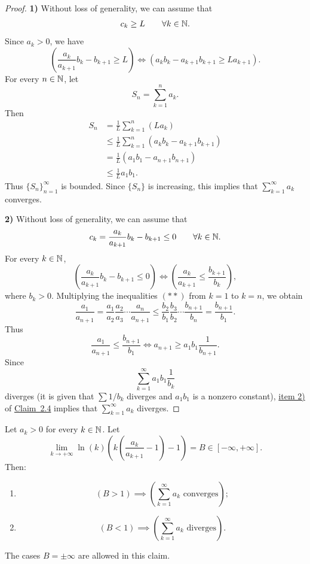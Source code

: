 \begin{proof}
\textbf{1)} Without loss of generality, we can assume that
\[
c_k\ge L\qquad\forall k\in\mathbb{N}.
\]
Since $a_k>0$, we have
\begin{equation}
\left(\frac{a_k}{a_{k+1}}b_k-b_{k+1}\ge L\right)
\iff
\left(a_kb_k-a_{k+1}b_{k+1}\ge La_{k+1}\right).
\tag{$*$}\label{eq:2:star:1}
\end{equation}
For every $n\in\mathbb{N}$, let
\[
S_n=\sum_{k=1}^{n}a_k.
\]
Then
\begin{align*}
S_n
&=\frac1L\sum_{k=1}^{n}(La_k)\\
&\le\frac1L\sum_{k=1}^{n}(a_kb_k-a_{k+1}b_{k+1})\\
&=\frac1L(a_1b_1-a_{n+1}b_{n+1})\\
&\le\frac1L a_1b_1.
\end{align*}
Thus $\{S_n\}_{n=1}^{\infty}$ is bounded. Since $\{S_n\}$ is increasing, this implies that $\sum_{k=1}^{\infty}a_k$ converges.

\medskip
\noindent\textbf{2)} Without loss of generality, we can assume that
\[
c_k=\frac{a_k}{a_{k+1}}b_k-b_{k+1}\le0
\qquad\forall k\in\mathbb{N}.
\]
For every $k\in\mathbb{N}$,
\begin{equation}
\left(\frac{a_k}{a_{k+1}}b_k-b_{k+1}\le0\right)
\iff
\left(\frac{a_k}{a_{k+1}}\le\frac{b_{k+1}}{b_k}\right),
\tag{$**$}\label{eq:2:starstar:1}
\end{equation}
where $b_k>0$. Multiplying the inequalities \hyperref[eq:2:starstar:1]{$(**)$} from $k=1$ to $k=n$, we obtain
\[
\frac{a_1}{a_{n+1}}
=\frac{a_1}{a_2}\frac{a_2}{a_3}\cdots\frac{a_n}{a_{n+1}}
\le
\frac{b_2}{b_1}\frac{b_3}{b_2}\cdots\frac{b_{n+1}}{b_n}
=\frac{b_{n+1}}{b_1}.
\]
Thus
\[
\frac{a_1}{a_{n+1}}\le\frac{b_{n+1}}{b_1}
\iff
a_{n+1}\ge a_1b_1\frac1{b_{n+1}}.
\]
Since
\[
\sum_{k=1}^{\infty}a_1b_1\frac1{b_k}
\]
diverges (it is given that $\sum 1/b_k$ diverges and $a_1b_1$ is a nonzero constant), \hyperref[item:claim:2.4:2]{item 2)} of \hyperref[claim:2.4]{Claim~2.4} implies that $\sum_{k=1}^{\infty}a_k$ diverges.
\end{proof}

\begin{claim}\label{claim:2.14}
Let $a_k>0$ for every $k\in\mathbb{N}$. Let
\[
\lim_{k\to+\infty}
\ln(k)\left(k\left(\frac{a_k}{a_{k+1}}-1\right)-1\right)
=B\in[-\infty,+\infty].
\]
Then:
\begin{enumerate}[label=\arabic*)]
\item\label{item:claim:2.14:1}
\[
(B>1)\implies\left(\sum_{k=1}^{\infty}a_k\text{ converges}\right);
\]
\item\label{item:claim:2.14:2}
\[
(B<1)\implies\left(\sum_{k=1}^{\infty}a_k\text{ diverges}\right).
\]
\end{enumerate}
The cases $B=\pm\infty$ are allowed in this claim.
\end{claim}

